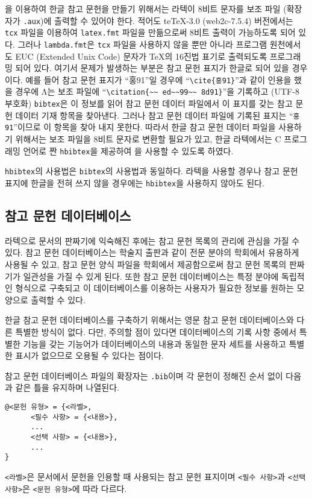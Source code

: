 \BibTeX{}을 이용하여 한글 참고 문헌을 만들기 위해서는 라텍이 8비트
문자를 보조 파일 (확장자가 \texttt{.aux})에 출력할 수 있어야 한다.
적어도 te\TeX-3.0 (web2c-7.5.4) 버전에서는 \texttt{tcx} 파일을 이용하여
\texttt{latex.fmt} 파일을 만듦으로써 8비트 출력이 가능하도록 되어
있다.  그러나 \texttt{lambda.fmt}은 \texttt{tcx} 파일을 사용하지
않을 뿐만 아니라 프로그램 원천에서도 EUC (Extended Unix Code) 문자가
\TeX{}의 16진법 표기로 출력되도록 프로그래밍 되어 있다.  여기서
문제가 발생하는 부분은 참고 문헌 표지가 한글로 되어 있을 경우이다.
예를 들어 참고 문헌 표지가 ``홍91''일 경우에
``\texttt{\textbackslash{}cite\{홍91\}}''과 같이 인용을 했을 경우에 Λ는
보조 파일에
``\texttt{\textbackslash{}citation\{\textasciitilde\textasciitilde
  ed\textasciitilde\textasciitilde 99\textasciitilde\textasciitilde
  8d91\}}''을 기록하고 (UTF-8 부호화) \texttt{bibtex}은 이 정보를 읽어
참고 문헌 데이터 파일에서 이 표지를 갖는 참고 문헌 데이터 기재 항목을
찾아낸다.  그러나 참고 문헌 데이터 파일에 기록된 표지는
``\texttt{홍91}''이므로 이 항목을 찾아 내지 못한다.  따라서 한글 참고
문헌 데이터 파일을 사용하기 위해서는 보조 파일을 8비트 문자로 변환할
필요가 있고, 한글 라텍에서는 C 프로그래밍 언어로 짠 \texttt{hbibtex}을
제공하여 \BibTeX{}을 사용할 수 있도록 하였다.%

\texttt{hbibtex}의 사용법은 \texttt{bibtex}의 사용법과 동일하다.
라텍을 사용할 경우나 참고 문헌 표지에 한글을 전혀 쓰지 않을 경우에는
\texttt{hbibtex}을 사용하지 않아도 된다.

\subsection{참고 문헌 데이터베이스}
\label{sec:bib}

라텍으로 문서의 판짜기에 익숙해진 후에는 참고 문헌 목록의 관리에
관심을 가질 수 있다.  참고 문헌 데이터베이스는 학술지 출판과 같이
전문 분야의 학회에서 유용하게 사용될 수 있고, 참고 문헌 양식 파일을
학회에서 제공함으로써 참고 문헌 목록의 판짜기가 일관성을 가질 수 있게
된다.  또한 참고 문헌 데이터베이스는 특정 분야에 독립적인 형식으로
구축되고 이 데이터베이스를 이용하는 사용자가 필요한 정보를 원하는
모양으로 출력할 수 있다.

한글 참고 문헌 데이터베이스를 구축하기 위해서는 영문 참고 문헌
데이터베이스와 다른 특별한 방식이 없다.  다만, 주의할 점이 있다면
데이터베이스의 기록 사항 중에서 특별한 기능을 갖는 기능어가
데이터베이스의 내용과 동일한 문자 세트를 사용하고 특별한 표시가
없으므로 오용될 수 있다는 점이다.

참고 문헌 데이터베이스 파일의 확장자는 \texttt{.bib}이며 각 문헌이
정해진 순서 없이 다음과 같은 틀을 유지하며 나열된다.
\begin{verbatim}
@<문헌 유형> = {<라벨>,
      <필수 사항> = {<내용>},
      ...
      <선택 사항> = {<내용>},
      ...
}
\end{verbatim}
\texttt{<라벨>}은 문서에서 문헌을 인용할 때 사용되는 참고 문헌 표지이며
\texttt{<필수 사항>}과 \texttt{<선택 사항>}은 \texttt{<문헌 유형>}에
따라 다르다.


